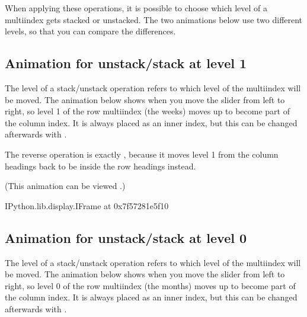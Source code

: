 \documentclass[letterpaper,10pt,english]{jupyterBook}
\begin{document}
\sphinxAtStartPar
When applying these operations, it is possible to choose which level of a multi\sphinxhyphen{}index gets stacked or unstacked.  The two animations below use two different levels, so that you can compare the differences.


\subsection{Animation for unstack/stack at level 1}
\label{\detokenize{chapter-6-single-table-verbs:animation-for-unstack-stack-at-level-1}}
\sphinxAtStartPar
The level of a stack/unstack operation refers to which level of the multi\sphinxhyphen{}index will be moved.  The animation below shows  when you move the slider from left to right, so level 1 of the row multi\sphinxhyphen{}index (the weeks) moves up to become part of the column index.  It is always placed as an inner index, but this can be changed afterwards with .

\sphinxAtStartPar
The reverse operation is exactly , because it moves level 1 from the column headings back to be inside the row headings instead.

\sphinxAtStartPar
(This animation can be viewed .)

\begin{sphinxVerbatim}[commandchars=\\\{\}]
\PYGZlt{}IPython.lib.display.IFrame at 0x7f57281e5f10\PYGZgt{}
\end{sphinxVerbatim}


\subsection{Animation for unstack/stack at level 0}
\label{\detokenize{chapter-6-single-table-verbs:animation-for-unstack-stack-at-level-0}}
\sphinxAtStartPar
The level of a stack/unstack operation refers to which level of the multi\sphinxhyphen{}index will be moved.  The animation below shows  when you move the slider from left to right, so level 0 of the row multi\sphinxhyphen{}index (the months) moves up to become part of the column index.  It is always placed as an inner index, but this can be changed afterwards with .
\end{document}
